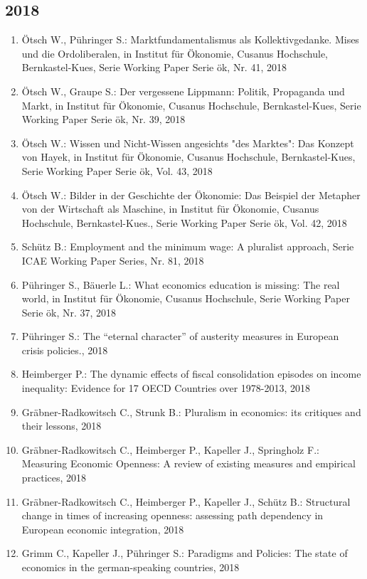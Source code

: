 \subsection*{2018}
\begin{enumerate}
    	 \item Ötsch W., Pühringer S.: Marktfundamentalismus als Kollektivgedanke. Mises und die Ordoliberalen, in Institut für Ökonomie, Cusanus Hochschule, Bernkastel-Kues, Serie Working Paper Serie ök, Nr. 41, 2018
	 \item Ötsch W., Graupe S.: Der vergessene Lippmann: Politik, Propaganda und Markt, in Institut für Ökonomie, Cusanus Hochschule, Bernkastel-Kues, Serie Working Paper Serie ök, Nr. 39, 2018
	 \item Ötsch W.: Wissen und Nicht-Wissen angesichts "des Marktes": Das Konzept von Hayek, in Institut für Ökonomie, Cusanus Hochschule, Bernkastel-Kues, Serie Working Paper Serie ök, Vol. 43, 2018
	 \item Ötsch W.: Bilder in der Geschichte der Ökonomie: Das Beispiel der Metapher von der Wirtschaft als Maschine, in Institut für Ökonomie, Cusanus Hochschule, Bernkastel-Kues., Serie Working Paper Serie ök, Vol. 42, 2018
	 \item Schütz B.: Employment and the minimum wage: A pluralist approach, Serie ICAE Working Paper Series, Nr. 81, 2018
	 \item Pühringer S., Bäuerle L.: What economics education is missing: The real world, in Institut für Ökonomie, Cusanus Hochschule, Serie Working Paper Serie ök, Nr. 37, 2018
	 \item Pühringer S.: The “eternal character” of austerity measures in European crisis policies., 2018
	 \item Heimberger P.: The dynamic effects of fiscal consolidation episodes on income inequality: Evidence for 17 OECD Countries over 1978-2013, 2018
	 \item Gräbner-Radkowitsch C., Strunk B.: Pluralism in economics: its critiques and their lessons, 2018
	 \item Gräbner-Radkowitsch C., Heimberger P., Kapeller J., Springholz F.: Measuring Economic Openness: A review of existing measures and empirical practices, 2018
	 \item Gräbner-Radkowitsch C., Heimberger P., Kapeller J., Schütz B.: Structural change in times of increasing openness: assessing path dependency in European economic integration, 2018
	 \item Grimm C., Kapeller J., Pühringer S.: Paradigms and Policies: The state of economics in the german-speaking countries, 2018

\end{enumerate}
